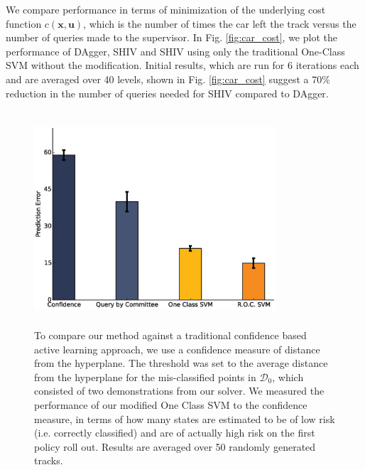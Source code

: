 \documentclass[10pt, conference]{ieeeconf}      %
\newcommand{\bu}{\mathbf{u}}
\newcommand{\bx}{\mathbf{x}}
\begin{document}
We compare performance in terms of minimization of the underlying cost function $c(\bx,\bu)$, which is the  number of times the car left the track versus the number of queries made to the supervisor. In Fig. \ref{fig:car_cost}, we plot the performance of DAgger, SHIV and SHIV using only the traditional One-Class SVM without the modification.  Initial results, which are run for 6 iterations each and are averaged over 40 levels, shown in Fig. \ref{fig:car_cost} suggest a $70\%$ reduction in the number of queries needed for SHIV compared to DAgger. 
 

\begin{figure}[t]
\centering
\includegraphics[width=9cm, height=8cm]{figures/risk_bar.eps}
   \caption { \footnotesize  To compare our method against a traditional confidence based active learning approach, we use a confidence measure  of distance from the hyperplane. The threshold was set to the average distance from the hyperplane for the mis-classified points in $\mathcal{D}_0$, which consisted of two demonstrations from our solver. We measured the performance of our modified One Class SVM to the confidence measure, in terms of how many states are estimated to be of low risk (i.e. correctly classified) and are of actually high risk on the first policy roll out. Results  are averaged over 50 randomly generated tracks. 
   }

\label{fig:active_comp}
\end{figure}
\end{document}
